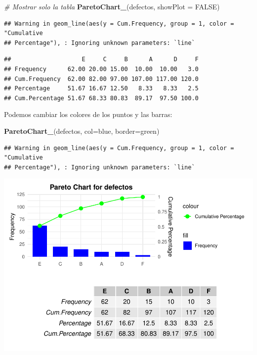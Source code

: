 \documentclass[
]{book}
\newenvironment{Shaded}{\begin{snugshade}}{\end{snugshade}}
\newcommand{\AttributeTok}[1]{\textcolor[rgb]{0.13,0.29,0.53}{#1}}
\newcommand{\CommentTok}[1]{\textcolor[rgb]{0.56,0.35,0.01}{\textit{#1}}}
\newcommand{\ConstantTok}[1]{\textcolor[rgb]{0.56,0.35,0.01}{#1}}
\newcommand{\FunctionTok}[1]{\textcolor[rgb]{0.13,0.29,0.53}{\textbf{#1}}}
\newcommand{\NormalTok}[1]{#1}
\newcommand{\StringTok}[1]{\textcolor[rgb]{0.31,0.60,0.02}{#1}}
\begin{document}
\begin{Shaded}
\begin{Highlighting}[]
\CommentTok{\# Mostrar solo la tabla}
\FunctionTok{ParetoChart\_}\NormalTok{(defectos, }\AttributeTok{showPlot =} \ConstantTok{FALSE}\NormalTok{)}
\end{Highlighting}
\end{Shaded}

\begin{verbatim}
## Warning in geom_line(aes(y = Cum.Frequency, group = 1, color = "Cumulative
## Percentage"), : Ignoring unknown parameters: `line`
\end{verbatim}

\begin{verbatim}
##                    E     C     B      A      D     F
## Frequency      62.00 20.00 15.00  10.00  10.00   3.0
## Cum.Frequency  62.00 82.00 97.00 107.00 117.00 120.0
## Percentage     51.67 16.67 12.50   8.33   8.33   2.5
## Cum.Percentage 51.67 68.33 80.83  89.17  97.50 100.0
\end{verbatim}

Podemos cambiar los colores de los puntos y las barras:

\begin{Shaded}
\begin{Highlighting}[]
\FunctionTok{ParetoChart\_}\NormalTok{(defectos, }\AttributeTok{col=}\StringTok{\textquotesingle{}blue\textquotesingle{}}\NormalTok{, }\AttributeTok{border=}\StringTok{\textquotesingle{}green\textquotesingle{}}\NormalTok{)}
\end{Highlighting}
\end{Shaded}

\begin{verbatim}
## Warning in geom_line(aes(y = Cum.Frequency, group = 1, color = "Cumulative
## Percentage"), : Ignoring unknown parameters: `line`
\end{verbatim}

\includegraphics{Libro_TidyQualityTools_files/figure-latex/unnamed-chunk-140-1.pdf}
\end{document}

